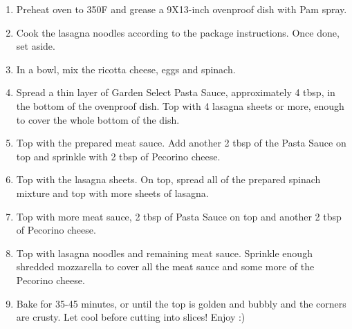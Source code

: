\begin{enumerate}
    \item Preheat oven to 350\degree F and grease a 9X13-inch ovenproof dish with Pam spray.
    \item Cook the lasagna noodles according to the package instructions. Once done, set aside.
    \item In a bowl, mix the ricotta cheese, eggs and spinach.
    \item Spread a thin layer of Garden Select Pasta Sauce, approximately 4 tbsp, in the bottom of the ovenproof dish. Top with 4 lasagna sheets or more, enough to cover the whole bottom of the dish.
    \item Top with the prepared meat sauce. Add another 2 tbsp of the Pasta Sauce on top and sprinkle with 2 tbsp of Pecorino cheese.
    \item Top with the lasagna sheets. On top, spread all of the prepared spinach mixture and top with more sheets of lasagna.
    \item Top with more meat sauce, 2 tbsp of Pasta Sauce on top and another 2 tbsp of Pecorino cheese.
    \item Top with lasagna noodles and remaining meat sauce. Sprinkle enough shredded mozzarella to cover all the meat sauce and some more of the Pecorino cheese.
    \item Bake for 35-45 minutes, or until the top is golden and bubbly and the corners are crusty. Let cool before cutting into slices! Enjoy :)
\end{enumerate}

